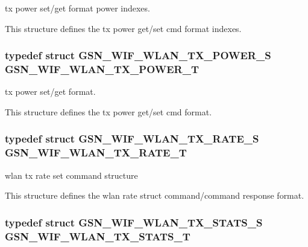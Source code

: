 tx power set/get format power indexes. 

This structure defines the tx power get/set cmd format indexes. \hypertarget{a00677_ga04f719a66b056bce000089417b9775bf}{
\subsubsection[{GSN\_\-WIF\_\-WLAN\_\-TX\_\-POWER\_\-T}]{\setlength{\rightskip}{0pt plus 5cm}typedef struct {\bf GSN\_\-WIF\_\-WLAN\_\-TX\_\-POWER\_\-S}  {\bf GSN\_\-WIF\_\-WLAN\_\-TX\_\-POWER\_\-T}}}
\label{a00677_ga04f719a66b056bce000089417b9775bf}


tx power set/get format. 

This structure defines the tx power get/set cmd format. \hypertarget{a00677_ga3248623873f75304b338528b6c711975}{
\subsubsection[{GSN\_\-WIF\_\-WLAN\_\-TX\_\-RATE\_\-T}]{\setlength{\rightskip}{0pt plus 5cm}typedef struct {\bf GSN\_\-WIF\_\-WLAN\_\-TX\_\-RATE\_\-S}  {\bf GSN\_\-WIF\_\-WLAN\_\-TX\_\-RATE\_\-T}}}
\label{a00677_ga3248623873f75304b338528b6c711975}


wlan tx rate set command structure 

This structure defines the wlan rate struct command/command response format. \hypertarget{a00677_gadedc886d92dbab6910156f707795905d}{
\subsubsection[{GSN\_\-WIF\_\-WLAN\_\-TX\_\-STATS\_\-T}]{\setlength{\rightskip}{0pt plus 5cm}typedef struct {\bf GSN\_\-WIF\_\-WLAN\_\-TX\_\-STATS\_\-S}  {\bf GSN\_\-WIF\_\-WLAN\_\-TX\_\-STATS\_\-T}}}
\label{a00677_gadedc886d92dbab6910156f707795905d}



